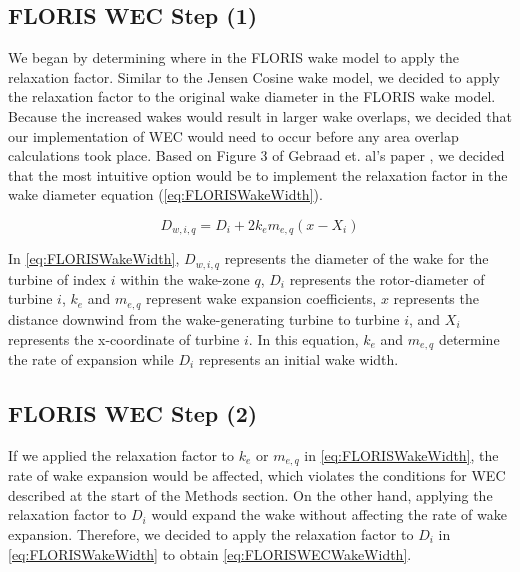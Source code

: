 \documentclass[a4paper]{jpconf}
\begin{document}
\subsection{FLORIS WEC Step (1)}

We began by determining where in the FLORIS wake model to apply the relaxation factor. Similar to the Jensen Cosine wake model, we decided to apply the relaxation factor to the original wake diameter in the FLORIS wake model. Because the increased wakes would result in larger wake overlaps, we decided that our implementation of WEC would need to occur before any area overlap calculations took place. Based on Figure 3 of Gebraad et. al's paper \cite{Gebraad2014}, we decided that the most intuitive option would be to implement the relaxation factor in the wake diameter equation (\cref{eq:FLORISWakeWidth}).

\begin{equation}
    D_{w,i,q} = D_i + 2k_em_{e,q}(x - X_i)
    \label{eq:FLORISWakeWidth}
\end{equation}

In \cref{eq:FLORISWakeWidth}, $D_{w,i,q}$ represents the diameter of the wake for the turbine of index $i$ within the wake-zone $q$, $D_i$ represents the rotor-diameter of turbine $i$, $k_e$ and $m_{e,q}$ represent wake expansion coefficients, $x$ represents the distance downwind from the wake-generating turbine to turbine $i$, and $X_i$ represents the x-coordinate of turbine $i$. In this equation, $k_e$ and $m_{e,q}$ determine the rate of expansion while $D_i$ represents an initial wake width.

\subsection{FLORIS WEC Step (2)}

If we applied the relaxation factor to $k_e$ or $m_{e,q}$ in \cref{eq:FLORISWakeWidth}, the rate of wake expansion would be affected, which violates the conditions for WEC described at the start of the Methods section. On the other hand, applying the relaxation factor to $D_i$ would expand the wake without affecting the rate of wake expansion. Therefore, we decided to apply the relaxation factor to $D_i$ in \cref{eq:FLORISWakeWidth} to obtain \cref{eq:FLORISWECWakeWidth}.
\end{document}
